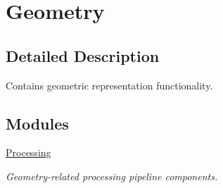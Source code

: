 \hypertarget{group___geometry_module}{}\section{Geometry}
\label{group___geometry_module}


\subsection{Detailed Description}
Contains geometric representation functionality. 

\subsection*{Modules}
\begin{DoxyCompactItemize}
\item 
\hyperlink{group___geometry_process}{Processing}
\begin{DoxyCompactList}\small\item\em Geometry-\/related processing pipeline components. \end{DoxyCompactList}\end{DoxyCompactItemize}
